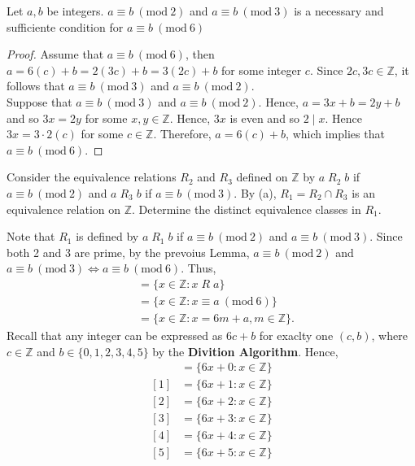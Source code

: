 \documentclass[12pt]{article}
\newcommand{\Z}{\mathbb{Z}}
\newcommand{\Mod}[1]{\ (\mathrm{mod}\ #1)}
\newenvironment{lemma}[2][Lemma]{\begin{trivlist}
		\item[\hskip \labelsep {\bfseries #1}\hskip \labelsep {\bfseries #2.}]}{\end{trivlist}}
\newenvironment{problem}[2][Problem]{\begin{trivlist}
		\item[\hskip \labelsep {\bfseries #1}\hskip \labelsep {\bfseries #2.}]}{\end{trivlist}}
\newenvironment{solution}[2][Solution]{\begin{trivlist}
		\item[\hskip \labelsep {\bfseries #1}\hskip \labelsep {\bfseries #2.}]}{\end{trivlist}}
\begin{document}
\begin{problem}{41}
\begin{enumerate}[label=(\alph*)]
 		\begin{lemma}{8.4.1}
 			Let  $a,b$ be integers. $a \equiv b \Mod{2}$ and $a\equiv b \Mod{3}$ is a necessary and sufficiente condition for $a\equiv b \Mod{6}$
 			\begin{proof}
 				Assume that $a\equiv b \Mod{6}$, then $a=6(c) +b = 2(3c) + b = 3(2c)+b$ for some integer $c$. Since $2c,3c\in \Z$, it follows that $a \equiv b \Mod{3}$ and $a\equiv b \Mod{2}$. \\
 				Suppose that $a \equiv b \Mod{3}$ and $a\equiv b \Mod{2}$. Hence, $a=3x+b=2y+b$ and so $3x=2y$ for some $x,y\in \Z$. Hence, $3x$ is even and so $2 \mid x$.  Hence $3x = 3\cdot 2(c)$ for some $c\in \Z$. Therefore, $a=6(c) + b$, which implies that $a\equiv b \Mod{6}$.
 			\end{proof}
 		\end{lemma}
 			\item Consider the equivalence relations $R_{2}$ and $R_{3}$ defined on $\Z$ by $a\; R_{2} \;b$ if $a\equiv b \Mod 2$ and $a\; R_{3}\; b$ if $a\equiv b \Mod{3}$. By (a), $R_{1} = R_{2}\cap R_{3}$ is an equivalence relation on $\Z$. Determine the distinct equivalence classes in $R_{1}$.
 			\begin{solution}{b}
 				Note that $R_{1}$ is defined by $a\; R_{1}\; b$ if $a\equiv b \Mod 2$ and $a\equiv b \Mod{3}$. Since both 2 and 3 are prime, by the prevoius Lemma, $a\equiv b \Mod 2$ and $a\equiv b \Mod{3} \iff a\equiv b\Mod{6}$. Thus, 
 				\begin{align*}
 					[a] &= \{x\in \Z:x\; R\;a\}\\
 					&= \{x\in \Z: x\equiv a\Mod{6}\}\\
 					&= \{x\in \Z: x = 6m + a, m\in \Z\}.
 				\end{align*}
 			Recall that any integer can be expressed as $6c+b$ for exaclty one $(c,b)$, where $c\in \Z$ and $b\in \{0,1,2,3,4,5\}$ by the \textbf{Divition Algorithm}. Hence,
 			\begin{align*}
 				[0] &= \{6x+0:x\in \Z\}\\
 				[1] &= \{6x+1:x\in \Z\}\\
 				[2] &= \{6x+2:x\in \Z\}\\
 				[3] &= \{6x+3:x\in \Z\}\\
 				[4] &= \{6x+4:x\in \Z\}\\
 				[5] &= \{6x+5:x\in \Z\}\\
 			\end{align*}
 			\end{solution}
  		\end{enumerate}
 	\end{problem}
\end{document}
